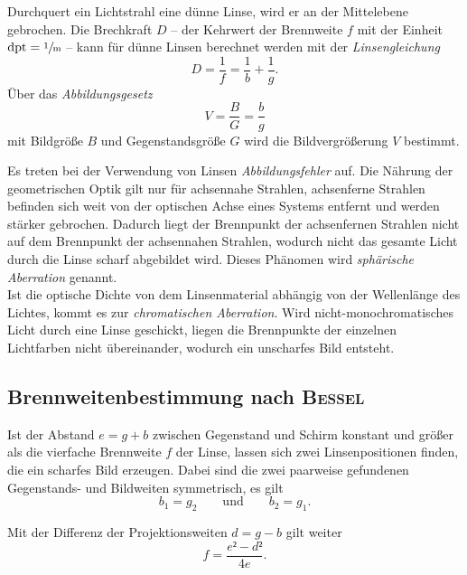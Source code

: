 Durchquert ein Lichtstrahl eine dünne Linse, wird er an der Mittelebene gebrochen.
Die Brechkraft $D$ -- der Kehrwert der Brennweite $f$ mit der Einheit $ \mathrm{dpt}=\sfrac{1}{\si{\meter}}$ -- kann für dünne Linsen berechnet werden mit der \emph{Linsengleichung}
\begin{equation}
	D=\frac{1}{f}=\frac{1}{b}+\frac{1}{g}.
	\label{eq:linsengleichung}
\end{equation}
\newpage
Über das \emph{Abbildungsgesetz} 
\begin{equation}
	V=\frac{B}{G}=\frac{b}{g}
\end{equation}
mit Bildgröße $B$ und Gegenstandsgröße $G$ wird die Bildvergrößerung $V$ bestimmt.

Es treten bei der Verwendung von Linsen \emph{Abbildungsfehler} auf. 
Die Nährung der geometrischen Optik gilt nur für achsennahe Strahlen, achsenferne Strahlen befinden sich weit von der optischen Achse eines Systems entfernt und werden stärker gebrochen. 
Dadurch liegt der Brennpunkt der achsenfernen Strahlen nicht auf dem Brennpunkt der achsennahen Strahlen, wodurch nicht das gesamte Licht durch die Linse scharf abgebildet wird. Dieses Phänomen wird \emph{sphärische Aberration} genannt.\\
Ist die optische Dichte von dem Linsenmaterial abhängig von der Wellenlänge des Lichtes, kommt es zur \emph{chromatischen Aberration}. 
Wird nicht-monochromatisches Licht durch eine Linse geschickt, liegen die Brennpunkte der einzelnen Lichtfarben nicht übereinander, wodurch ein unscharfes Bild entsteht.

\subsection{Brennweitenbestimmung nach \texorpdfstring{\textsc{Bessel}}{Bessel}}
\label{sec:theorie1}
Ist der Abstand $e=g+b$ zwischen Gegenstand und Schirm konstant und größer als die vierfache Brennweite $f$ der Linse, lassen sich zwei Linsenpositionen finden, die ein scharfes Bild erzeugen. 
Dabei sind die zwei paarweise gefundenen Gegenstands- und Bildweiten symmetrisch, es gilt
\begin{equation}
	b_1=g_2 \qquad \text{und} \qquad b_2=g_1.
\end{equation}

Mit der Differenz der Projektionsweiten $d= g-b$ gilt weiter
\begin{equation}
	f=\frac{e²-d²}{4e}.
\end{equation}


